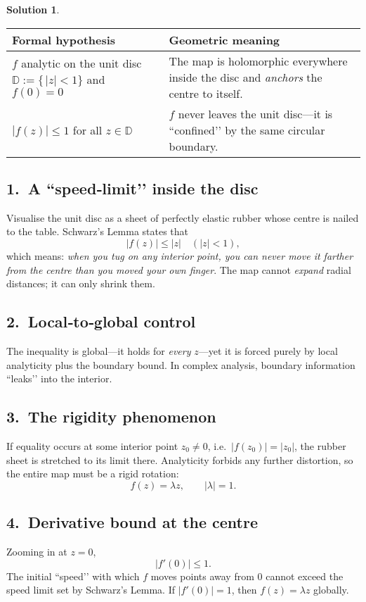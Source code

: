 \documentclass[12pt]{article}
\theoremstyle{definition} %
\newtheorem{solution}{Solution}
\theoremstyle{plain} %
\begin{document}
\begin{solution}

   \begin{center}
   \begin{tabular}{|l|p{8cm}|}
   \hline
   \textbf{Formal hypothesis} & \textbf{Geometric meaning} \\ \hline\hline
   $f$ analytic on the unit disc $\mathbb{D}:=\{\,|z|<1\}$ and $f(0)=0$
     & The map is holomorphic everywhere inside the disc and \emph{anchors} the centre to itself. \\ \hline
   $|f(z)|\le 1$ for all $z\in\mathbb{D}$
     & $f$ never leaves the unit disc—it is “confined’’ by the same circular boundary. \\ \hline
   \end{tabular}
   \end{center}
   
   \bigskip
   \subsection*{1.\ A “speed‑limit’’ inside the disc}
   Visualise the unit disc as a sheet of perfectly elastic rubber whose centre is nailed to the table.
   Schwarz’s Lemma states that
   \[
      |f(z)|\le |z| \quad (|z|<1),
   \]
   which means: \emph{when you tug on any interior point, you can never move it farther from the centre than you moved your own finger}.  
   The map cannot \emph{expand} radial distances; it can only shrink them.
   
   \bigskip
   \subsection*{2.\ Local‐to‐global control}
   The inequality is global—it holds for \emph{every} $z$—yet it is forced purely by local analyticity plus the boundary bound.
   In complex analysis, boundary information “leaks’’ into the interior.
   
   \bigskip
   \subsection*{3.\ The rigidity phenomenon}
   If equality occurs at some interior point $z_0\neq0$, i.e.\ $|f(z_0)|=|z_0|$, the rubber sheet is stretched to its limit there.
   Analyticity forbids any further distortion, so the entire map must be a rigid rotation:
   \[
      f(z)=\lambda z, \qquad |\lambda|=1.
   \]
   
   \bigskip
   \subsection*{4.\ Derivative bound at the centre}
   Zooming in at $z=0$,
   \[
      |f'(0)|\le 1.
   \]
   The initial “speed’’ with which $f$ moves points away from $0$ cannot exceed the speed limit set by Schwarz’s Lemma.  
   If $|f'(0)|=1$, then $f(z)=\lambda z$ globally.
   

\end{solution}
\end{document}

